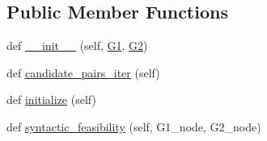 \subsection*{Public Member Functions}
\begin{DoxyCompactItemize}
\item 
def \hyperlink{classnetworkx_1_1algorithms_1_1isomorphism_1_1isomorphvf2_1_1DiGraphMatcher_ae6b63baf07c973e055ec0de7923f7395}{\+\_\+\+\_\+init\+\_\+\+\_\+} (self, \hyperlink{classnetworkx_1_1algorithms_1_1isomorphism_1_1isomorphvf2_1_1GraphMatcher_a7a5a2c6d9d4bc47ea16dd8392c2c2e17}{G1}, \hyperlink{classnetworkx_1_1algorithms_1_1isomorphism_1_1isomorphvf2_1_1GraphMatcher_a0513325f608a0a7357d0b43111e233ec}{G2})
\item 
def \hyperlink{classnetworkx_1_1algorithms_1_1isomorphism_1_1isomorphvf2_1_1DiGraphMatcher_ac29b7e1fe6cd42afdcee2e277a3d17df}{candidate\+\_\+pairs\+\_\+iter} (self)
\item 
def \hyperlink{classnetworkx_1_1algorithms_1_1isomorphism_1_1isomorphvf2_1_1DiGraphMatcher_adb3eafb4db82f7413d0af7bb7e2c4d5c}{initialize} (self)
\item 
def \hyperlink{classnetworkx_1_1algorithms_1_1isomorphism_1_1isomorphvf2_1_1DiGraphMatcher_acdd45ff41db82cbe012b9ec583158bf7}{syntactic\+\_\+feasibility} (self, G1\+\_\+node, G2\+\_\+node)
\end{DoxyCompactItemize}
